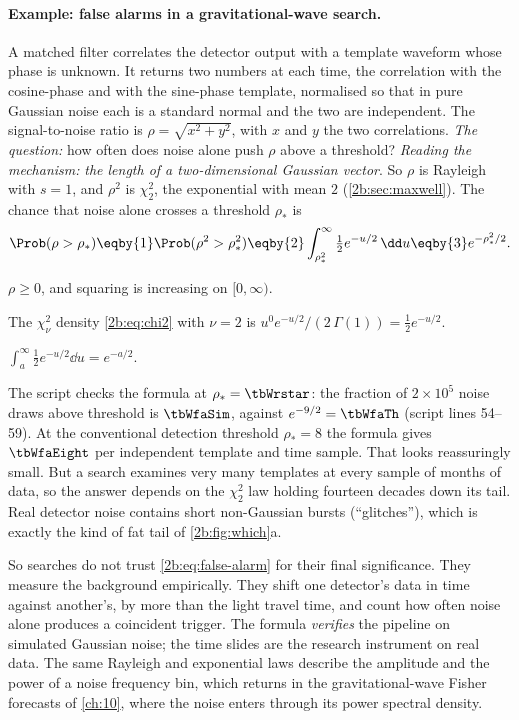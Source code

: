 \paragraph{Example: false alarms in a gravitational-wave search.} A matched filter correlates the detector output with a template waveform whose phase is unknown. It returns two numbers at each time, the correlation with the cosine-phase and with the sine-phase template, normalised so that in pure Gaussian noise each is a standard normal and the two are independent. The signal-to-noise ratio is $\rho=\sqrt{x^2+y^2}$, with $x$ and $y$ the two correlations. \emph{The question:} how often does noise alone push $\rho$ above a threshold? \emph{Reading the mechanism:} \emph{the length of a two-dimensional Gaussian vector}. So $\rho$ is Rayleigh with $s=1$, and $\rho^2$ is $\chi^2_2$, the exponential with mean $2$ (\cref{2b:sec:maxwell}). The chance that noise alone crosses a threshold $\rho_*$ is
\begin{align}
  \Prob(\rho>\rho_*)
  \eqby{1}\Prob(\rho^2>\rho_*^2)
  \eqby{2}\int_{\rho_*^2}^{\infty}\tfrac12e^{-u/2}\,\dd u
  \eqby{3}e^{-\rho_*^2/2} .
  \label{2b:eq:false-alarm}
\end{align}
\begin{explain}
  \item $\rho\ge0$, and squaring is increasing on $[0,\infty)$.
  \item The $\chi^2_\nu$ density \eqref{2b:eq:chi2} with $\nu=2$ is $u^{0}e^{-u/2}/(2\,\Gamma(1))=\frac12e^{-u/2}$.
  \item $\int_a^\infty\frac12e^{-u/2}\dd u=e^{-a/2}$.
\end{explain}
The script checks the formula at $\rho_*=\tbWrstar$: the fraction of $2\times10^5$ noise draws above threshold is $\tbWfaSim$, against $e^{-9/2}=\tbWfaTh$ (script lines 54--59). At the conventional detection threshold $\rho_*=8$ the formula gives $\tbWfaEight$ per independent template and time sample. That looks reassuringly small. But a search examines very many templates at every sample of months of data, so the answer depends on the $\chi^2_2$ law holding fourteen decades down its tail. Real detector noise contains short non-Gaussian bursts (``glitches''), which is exactly the kind of fat tail of \cref{2b:fig:which}a.

So searches do not trust \eqref{2b:eq:false-alarm} for their final significance. They measure the background empirically. They shift one detector's data in time against another's, by more than the light travel time, and count how often noise alone produces a coincident trigger. The formula \emph{verifies} the pipeline on simulated Gaussian noise; the time slides are the research instrument on real data. The same Rayleigh and exponential laws describe the amplitude and the power of a noise frequency bin, which returns in the gravitational-wave Fisher forecasts of \cref{ch:10}, where the noise enters through its power spectral density.


